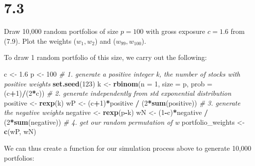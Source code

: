 \documentclass[11pt,]{article}
\newenvironment{Shaded}{\begin{snugshade}}{\end{snugshade}}
\newcommand{\KeywordTok}[1]{\textcolor[rgb]{0.13,0.29,0.53}{\textbf{#1}}}
\newcommand{\DataTypeTok}[1]{\textcolor[rgb]{0.13,0.29,0.53}{#1}}
\newcommand{\DecValTok}[1]{\textcolor[rgb]{0.00,0.00,0.81}{#1}}
\newcommand{\FloatTok}[1]{\textcolor[rgb]{0.00,0.00,0.81}{#1}}
\newcommand{\StringTok}[1]{\textcolor[rgb]{0.31,0.60,0.02}{#1}}
\newcommand{\CommentTok}[1]{\textcolor[rgb]{0.56,0.35,0.01}{\textit{#1}}}
\newcommand{\OperatorTok}[1]{\textcolor[rgb]{0.81,0.36,0.00}{\textbf{#1}}}
\newcommand{\NormalTok}[1]{#1}
\renewenvironment{quote}{\begin{shaded*}}{\end{shaded*}}
\begin{document}
\newpage 

\section{7.3}\label{section-2}

Draw 10,000 random portfolios of size \(p=100\) with gross exposure
\(c=1.6\) from (7.9). Plot the weights (\(w_1, w_2\)) and
(\(w_{99}, w_{100}\)).

\begin{quote}
To draw 1 random portfolio of this size, we carry out the following:
\end{quote}

\begin{Shaded}
\begin{Highlighting}[]
\NormalTok{c <-}\StringTok{ }\FloatTok{1.6}
\NormalTok{p <-}\StringTok{ }\DecValTok{100} 
\CommentTok{# 1. generate a positive integer k, the number of stocks with positive weights}
\KeywordTok{set.seed}\NormalTok{(}\DecValTok{123}\NormalTok{)}
\NormalTok{k <-}\StringTok{ }\KeywordTok{rbinom}\NormalTok{(}\DataTypeTok{n =} \DecValTok{1}\NormalTok{, }\DataTypeTok{size =}\NormalTok{ p, }\DataTypeTok{prob =}\NormalTok{ (c}\OperatorTok{+}\DecValTok{1}\NormalTok{)}\OperatorTok{/}\NormalTok{(}\DecValTok{2}\OperatorTok{*}\NormalTok{c))}
\CommentTok{# 2. generate independently from std exponential distribution  }
\NormalTok{positive <-}\StringTok{ }\KeywordTok{rexp}\NormalTok{(k)}
\NormalTok{wP <-}\StringTok{ }\NormalTok{(c}\OperatorTok{+}\DecValTok{1}\NormalTok{)}\OperatorTok{*}\NormalTok{positive }\OperatorTok{/}\StringTok{ }\NormalTok{(}\DecValTok{2}\OperatorTok{*}\KeywordTok{sum}\NormalTok{(positive)) }
\CommentTok{# 3. generate the negative weights }
\NormalTok{negative <-}\StringTok{ }\KeywordTok{rexp}\NormalTok{(p}\OperatorTok{-}\NormalTok{k)}
\NormalTok{wN <-}\StringTok{ }\NormalTok{(}\DecValTok{1}\OperatorTok{-}\NormalTok{c)}\OperatorTok{*}\NormalTok{negative }\OperatorTok{/}\StringTok{ }\NormalTok{(}\DecValTok{2}\OperatorTok{*}\KeywordTok{sum}\NormalTok{(negative))}
\CommentTok{# 4. get our random permutation of w  }
\NormalTok{portfolio_weights <-}\StringTok{ }\KeywordTok{c}\NormalTok{(wP, wN)}
\end{Highlighting}
\end{Shaded}

\begin{quote}
We can thus create a function for our simulation process above to
generate 10,000 portfolios:
\end{quote}
\end{document}

